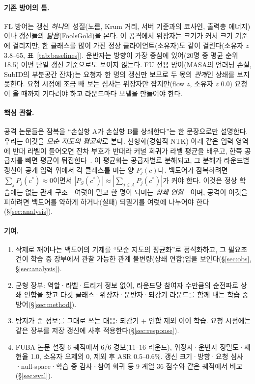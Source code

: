 \documentclass[10pt,a4paper]{article}
\begin{document}
\paragraph{기존 방어의 틈.}
FL 방어는 갱신 \emph{하나}의 성질(노름, Krum 거리, 서버 기준과의 코사인, 출력층 에너지)이나 갱신들의 \emph{닮음}(FoolsGold)을 본다. 이 공격에서 위장자는 크기가 커서 크기 기준에 걸리지만, 한 클래스를 많이 가진 정상 클라이언트(소유자)도 같이 걸린다(소유자 $z$ 3.8--65, 표~\ref{tab:baselines}). 운반자는 방향이 가장 중심에 있어(20명 중 평균 순위 18.5) 어떤 단일 갱신 기준으로도 보이지 않는다. FU 전용 방어(MASA의 언러닝 손실, SubID의 부분공간 잔차)는 요청자 한 명의 갱신만 보므로 두 몫의 \emph{관계}인 상쇄를 보지 못한다. 요청 시점에 조금 빼 보는 심사는 위장자만 잡지만(flow $z$, 소유자 $z$ 0.0) 요청이 올 때까지 기다려야 하고 라운드마다 모델을 만들어야 한다.

\paragraph{핵심 관찰.}
공격 논문들은 잠복을 ``손실항 A가 손실항 B를 상쇄한다''는 한 문장으로만 설명한다. 우리는 이것을 \emph{모순 지도의 평균화}로 본다. 선형화(경험적 NTK) 아래 같은 입력 영역에 반대 라벨이 들어오면 잔차 부호가 반대라 커널 회귀가 라벨 평균을 배우고, 한쪽 공급자를 빼면 평균이 뒤집힌다~\cite{hayase2022}. 이 평균화는 공급자별로 분해되고, 그 분해가 라운드별 갱신이 공개 입력 위에서 각 클래스를 미는 양 $P_j(c)$다. 백도어가 잠복하려면 $\sum_j P_j(c^*)\approx 0$이면서 $|P_S(c^*)|\approx|\sum_{j\in A}P_j(c^*)|$가 커야 한다. 이것은 정상 학습에는 없는 관계 구조---여럿이 밀고 한 명이 되미는 \emph{상쇄 연합}---이며, 공격이 이것을 피하려면 백도어를 약하게 하거나(실패) 되밀기를 여럿에 나누어야 한다(\S\ref{sec:analysis}).

\paragraph{기여.}
\begin{enumerate}
\item 삭제로 깨어나는 백도어의 기제를 ``모순 지도의 평균화''로 정식화하고, 그 필요조건이 학습 중 장부에서 관찰 가능한 관계 불변량(상쇄 연합)임을 보인다(\S\ref{sec:obs}, \S\ref{sec:analysis}).
\item 균형 장부: 역할·라벨·트리거 정보 없이, 라운드당 참여자 수만큼의 순전파로 상쇄 연합을 찾고 타깃 클래스·위장자·운반자·되감기 라운드를 함께 내는 학습 중 방어(\S\ref{sec:method}).
\item 탐지가 준 정보를 그대로 쓰는 대응: 되감기 + 연합 제외 이어 학습. 요청 시점에는 같은 장부를 저장 갱신에 사후 적용한다(\S\ref{sec:response}).
\item FUBA 논문 설정 6 궤적에서 6/6 경보(11--16 라운드), 위장자·운반자 정밀도·재현율 1.0, 소유자 오제외 0, 제외 후 ASR 0.5--0.6\%. 갱신 크기·방향·요청 심사·null-space·학습 중 감사·참여 회귀 등 9 계열 36 점수와 같은 궤적에서 비교(\S\ref{sec:eval}).
\end{enumerate}
\end{document}
